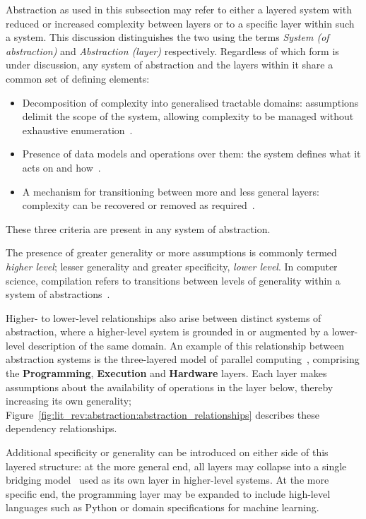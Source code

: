 Abstraction as used in this subsection may refer to either a layered system with reduced or increased complexity between layers or to a specific layer within such a system.
This discussion distinguishes the two using the terms \textit{System (of abstraction)} and \textit{Abstraction (layer)} respectively.
Regardless of which form is under discussion, any system of abstraction and the layers within it share a common set of defining elements:
\begin{itemize}
    \item Decomposition of complexity into generalised tractable domains: assumptions delimit the scope of the system, allowing complexity to be managed without exhaustive enumeration~\cite{Wing2006ComputationalThinking}.
    \item Presence of data models and operations over them: the system defines what it acts on and how~\cite{aho2022abstractions}.
    \item A mechanism for transitioning between more and less general layers: complexity can be recovered or removed as required~\cite{aho2022abstractions}.
\end{itemize}
These three criteria are present in any system of abstraction.

The presence of greater generality or more assumptions is commonly termed \textit{higher level}; lesser generality and greater specificity, \textit{lower level}.
In computer science, compilation refers to transitions between levels of generality within a system of abstractions~\cite{aho2022abstractions}.

Higher- to lower-level relationships also arise between distinct systems of abstraction, where a higher-level system is grounded in or augmented by a lower-level description of the same domain.
An example of this relationship between abstraction systems is the three-layered model of parallel computing~\cite{DiMatteo2024AbstractionHierarchy}, comprising the \textbf{Programming}, \textbf{Execution} and \textbf{Hardware} layers.
Each layer makes assumptions about the availability of operations in the layer below, thereby increasing its own generality; Figure~\ref{fig:lit_rev:abstraction:abstraction_relationships} describes these dependency relationships.

Additional specificity or generality can be introduced on either side of this layered structure: at the more general end, all layers may collapse into a single bridging model~\cite{Valiant1990BSP} used as its own layer in higher-level systems.
At the more specific end, the programming layer may be expanded to include high-level languages such as Python or domain specifications for machine learning.

